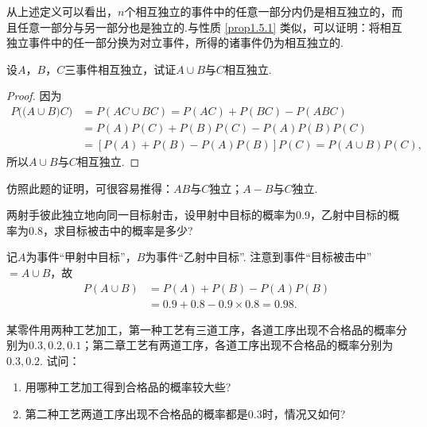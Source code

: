 从上述定义可以看出，$n$个相互独立的事件中的任意一部分内仍是相互独立的，而且任意一部分与另一部分也是独立的.与性质 \ref{prop1.5.1} 类似，可以证明：将相互独立事件中的任一部分换为对立事件，所得的诸事件仍为相互独立的.

\begin{example}
  设$A$，$B$，$C$三事件相互独立，试证$A\cup B$与$C$相互独立.
\end{example}
\begin{proof}
  因为
  \begin{align*}
    P\big(\big(A\cup B)C) & = P(AC \cup BC) = P(AC) + P(BC) - P(ABC) \\
    & = P(A)P(C) + P(B)P(C) - P(A)P(B)P(C) \\
    & = [P(A) + P(B) - P(A)P(B)]P(C) =
    P(A \cup B) P(C),
  \end{align*}
  所以$A\cup B$与$C$相互独立.
\end{proof}

仿照此题的证明，可很容易推得：$AB$与$C$独立；$A-B$与$C$独立.

\begin{example}
  两射手彼此独立地向同一目标射击，设甲射中目标的概率为0.9，乙射中目标的概率为0.8，求目标被击中的概率是多少?
\end{example}
\begin{solution}
  记$A$为事件“甲射中目标”，$B$为事件“乙射中目标”. 注意到事件“目标被击中”$=A\cup B$，故
  \begin{align*}
    P(A\cup B) & = P(A) + P(B) - P(A)P(B) \\
    & = 0.9 + 0.8 - 0.9\times 0.8 = 0.98.
  \end{align*}
\end{solution}

\begin{example}
  某零件用两种工艺加工，第一种工艺有三道工序，各道工序出现不合格品的概率分别为$0.3,0.2,0.1$；第二章工艺有两道工序，各道工序出现不合格品的概率分别为$0.3,0.2$. 试问：
  \begin{enumerate}[label=(\arabic*)]
    \item 用哪种工艺加工得到合格品的概率较大些?
    \item 第二种工艺两道工序出现不合格品的概率都是0.3时，情况又如何?
  \end{enumerate}
\end{example}

